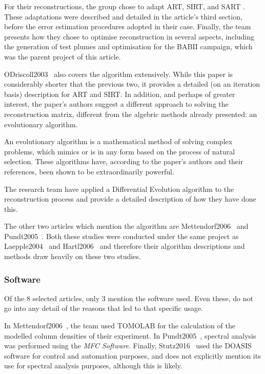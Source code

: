 For their reconstructions, the group chose to adapt ART, SIRT, and SART
. These adaptations were described and detailed in the article's third
section, before the error estimation procedures adopted in their case.
Finally, the team presents how they chose to optimise reconstruction in
several aspects, including the generation of test plumes and
optimisation for the BABII campaign, which was the parent project of
this article. 

ODriscoll2003~\cite{ODriscoll2003} also covers the algorithm
extensively. While this paper is considerably shorter that the previous
two, it provides a detailed (on an iteration basis) description for ART
and SIRT. In addition, and perhaps of greater interest, the paper's
authors suggest a different approach to solving the reconstruction
matrix, different from the algebric methods already presented: an
evolutionary algorithm.

An evolutionary algorithm is a mathematical method of solving complex
problems, which mimics or is in any form based on the process of natural
selection. These algorithms have, according to the paper's authors and
their references, been shown to be extraordinarily powerful.

The research team have applied a Differential Evolution algorithm to the
reconstruction process and provide a detailed description of how they
have done this.

The other two articles which mention the algorithm are
Mettendorf2006~\cite{Mettendorf2006} and Pundt2005~\cite{Pundt2005}.
Both these studies were conducted under the same project as
Laepple2004~\cite{Laepple2004} and Hartl2006~\cite{Hartl2006} and
therefore their algorithm descriptions and methods draw heavily on
these two studies.


\subsubsection{Software}
\label{ssub:software}

Of the 8 selected articles, only 3 mention the software used. Even these,
do not go into any detail of the reasons that led to that specific
usage. 

In Mettendorf2006~\cite{Mettendorf2006}, the team used TOMOLAB
for the calculation of the modelled column densities of their
experiment. In Pundt2005~\cite{Pundt2005}, spectral analysis was
performed using the \emph{MFC Software}. Finally,
Stutz2016~\cite{Stutz2016} used the DOASIS software for control and
automation purposes, and does not explicitly mention its use for
spectral analysis purposes, although this is likely.

